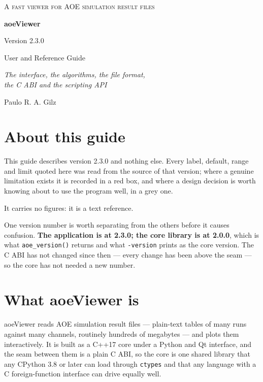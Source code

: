 \documentclass[11pt,a4paper,oneside]{report}
\newcommand{\appver}{2.3.0}
\newcommand{\code}[1]{\texttt{#1}}
\begin{document}
\begin{titlepage}
\centering
\vspace*{3cm}
{\small\scshape\color{aoeaccent} A fast viewer for AOE simulation result files\par}
\vspace{2.2cm}
{\Huge\bfseries aoeViewer\par}
\vspace{0.5cm}
{\Large Version \appver\par}
\vspace{2.4cm}
{\LARGE User and Reference Guide\par}
\vspace{0.6cm}
{\large\itshape The interface, the algorithms, the file format,\\
the C ABI and the scripting API\par}
\vspace{3cm}
{\large Paulo R. A. Gilz\par}
\vfill
\end{titlepage}

\tableofcontents
\clearpage

\chapter*{About this guide}

This guide describes version \appver{} and nothing else. Every label, default,
range and limit quoted here was read from the source of that version; where a
genuine limitation exists it is recorded in a red box, and where a design
decision is worth knowing about to use the program well, in a grey one.

It carries no figures: it is a text reference.

One version number is worth separating from the others before it causes
confusion. \textbf{The application is at \appver; the core library is at
2.0.0}, which is what \code{aoe\_version()} returns and what \code{-version}
prints as the core version. The C ABI has not changed since then --- every
change has been above the seam --- so the core has not needed a new number.

\chapter{What aoeViewer is}

aoeViewer reads AOE simulation result files --- plain-text tables of many runs
against many channels, routinely hundreds of megabytes --- and plots them
interactively. It is built as a C++17 core under a Python and Qt interface, and
the seam between them is a plain C ABI, so the core is one shared library that
any CPython 3.8 or later can load through \code{ctypes} and that any language
with a C foreign-function interface can drive equally well.
\end{document}

